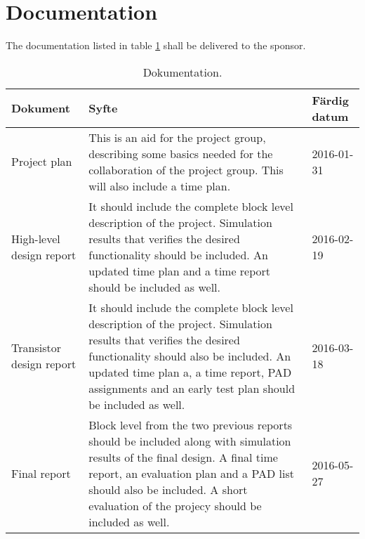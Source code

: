 \section{Documentation}
The documentation listed in table \ref{dokumentation:tabell} shall be delivered to the sponsor.

\begin{table}[H]
	\centering
		\begin{tabularx}{\textwidth}{| l | X | l |}
			\hline
			\textbf{Dokument} & \textbf{Syfte} & \textbf{Färdig datum} \\\hline
			
			{Project plan} & {This is an aid for the project group, describing some basics needed for the collaboration of the project group. This will also include a time plan.} & {2016-01-31} \\\hline
			
			{High-level design report} & {It should include the complete block level description of the project. Simulation results that verifies the desired functionality should be included. An updated time plan and a time report should be included as well.} & {2016-02-19} \\\hline
			
			{Transistor design report} & {It should include the complete block level description of the project. Simulation results that verifies the desired functionality should also be included. An updated time plan a, a time report, PAD assignments and an early test plan should be included as well. } & {2016-03-18} \\\hline
			
			{Final report} & {Block level from the two previous reports should be included along with simulation results of the final design. A final time report, an evaluation plan and a PAD list should also be included. A short evaluation of the projecy should be included as well.} & {2016-05-27} \\\hline
			
			
		\end{tabularx}
	\caption{Dokumentation.} \label{dokumentation:tabell}
\end{table}
